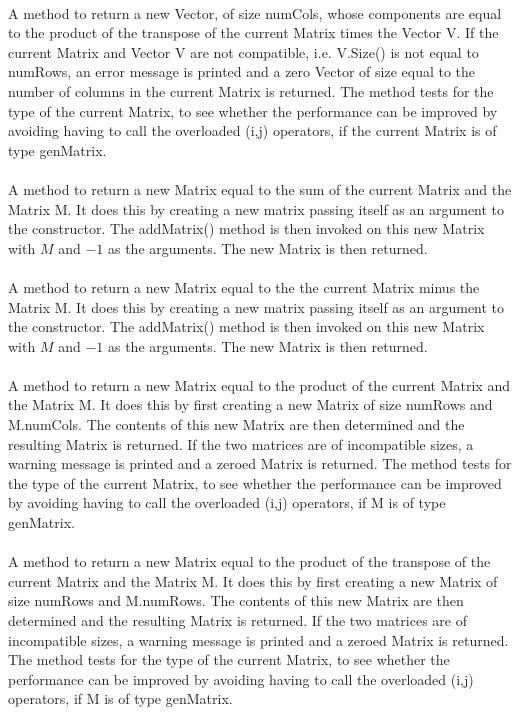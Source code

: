  \\ 
A method to return a new Vector, of size numCols, whose components are
equal to the product of the transpose of the current Matrix times the
Vector \p V. If the current Matrix and Vector \p V are not
compatible, i.e. V.Size() is not equal to numRows, an error message is
printed and a zero Vector of size equal to the number of columns in
the current Matrix is returned. The method tests for the type of the
current Matrix, to see whether the performance can be improved by
avoiding having to call the overloaded (i,j) operators, if the current
Matrix is of type genMatrix. \\ 

 \\
A method to return a new Matrix equal to the sum of the current Matrix
and the Matrix \p M. It does this by creating a new matrix passing
itself as an argument to the constructor. The addMatrix() method
is then invoked on this new Matrix with $M$ and $-1$ as the
arguments. The new Matrix is then returned. \\ 

 \\
A method to return a new Matrix equal to the the current Matrix minus
the Matrix \p M. It does this by creating a new matrix passing
itself as an argument to the constructor. The addMatrix() method
is then invoked on this new Matrix with $M$ and $-1$ as the
arguments. The new Matrix is then returned. \\ 

 \\
A method to return a new Matrix equal to the product of the current
Matrix and the Matrix \p M. It does this by first creating a new
Matrix of size numRows and M.numCols. The contents of this new Matrix
are then determined and the resulting Matrix is returned. If the two
matrices are of incompatible sizes, a warning message is printed and a
zeroed Matrix is returned. The method tests for the type of the
current Matrix, to see whether the performance can be improved by
avoiding having to call the overloaded (i,j) operators, if \p M 
is of type genMatrix. \\

 \\ 
A method to return a new Matrix equal to the product of the transpose
of the current Matrix and the Matrix \p M. It does this by first
creating a new Matrix of size numRows and M.numRows. The contents of
this new Matrix are then determined and the resulting Matrix is
returned. If the two matrices are of incompatible sizes, a warning
message is printed and a zeroed Matrix is returned. The method tests
for the type of the current Matrix, to see whether the performance can
be improved by avoiding having to call the overloaded (i,j) operators,
if \p M is of type genMatrix. \\


